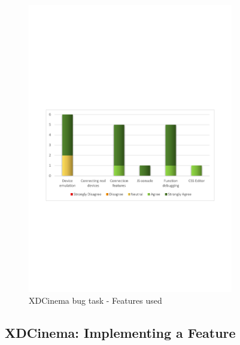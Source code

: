 \begin{figure}[H]
  \centering
    \includegraphics[width=0.8\textwidth]{images/charts/xdc_bug_features_used.pdf}
	\caption{XDCinema bug task - Features used}
	\label{fig:xdc_bug_features_used}
\end{figure}

\subsection{XDCinema: Implementing a Feature}

